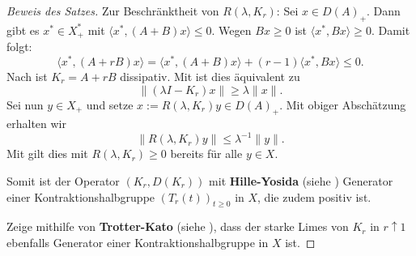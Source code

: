 \begin{proof}[Beweis des Satzes]
\par 
Zur Beschränktheit von $R(\lambda,K_r)$: Sei $x\in D(A)_+$. %
Dann gibt es $x^*\in X_+^*$ mit $\langle x^*, (A+B)x\rangle\leq 0$. Wegen $Bx\geq0$ ist $\langle x^*, Bx\rangle \geq0$. Damit folgt:
\begin{equation*}
\langle x^*, (A+rB)x\rangle = \langle x^*, (A+B)x\rangle + (r-1)\langle x^*, Bx\rangle \leq  0.
\end{equation*}
Nach \Cref{} ist $K_r=A+rB$ dissipativ. Mit  ist dies äquivalent zu 
\begin{equation*}\label{equation1}
\|(\lambda I - K_r)x\|\geq \lambda \|x\|.
\end{equation*}
Sei nun $y\in X_+$ und setze $x:=R(\lambda, K_r)y\in D(A)_+$. Mit obiger Abschätzung erhalten wir
\begin{equation}\label{Resolvente von K_r ist relativ beschränkt}
\|R(\lambda, K_r)y\|\leq \lambda^{-1}\|y\|.
\end{equation}
Mit  gilt dies mit $R(\lambda, K_r)\geq0$  bereits für alle $y\in X$.



\par
Somit ist  der Operator  $(K_r, D(K_r))$ mit \textbf{Hille-Yosida} (siehe ) Generator einer Kontraktionshalbgruppe $(T_r(t))_{t\geq0}$ in $X$, die zudem positiv ist.

\par
Zeige mithilfe von \textbf{Trotter-Kato} (siehe ), dass der starke Limes von $K_r$ in $r\uparrow 1$ ebenfalls Generator einer Kontraktionshalbgruppe in $X$ ist.


\end{proof}
